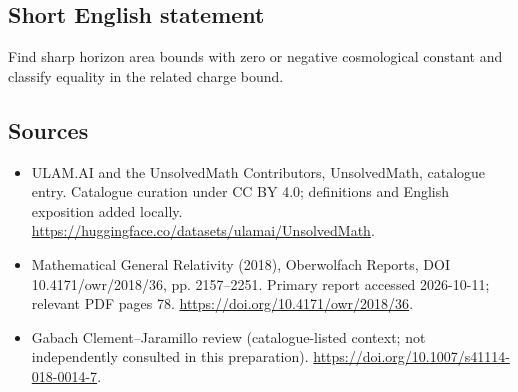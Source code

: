 \documentclass[11pt]{article}
\begin{document}
\subsection{Short English statement}
Find sharp horizon area bounds with zero or negative cosmological constant and classify equality in the related charge bound.
\subsection{Sources}
\begin{itemize}
\item[\hypertarget{source:statement:1}{S1}] ULAM.AI and the UnsolvedMath Contributors, UnsolvedMath, catalogue entry. Catalogue curation under CC BY 4.0; definitions and English exposition added locally.
\url{https://huggingface.co/datasets/ulamai/UnsolvedMath}.
\item[\hypertarget{source:statement:2}{S2}] Mathematical General Relativity (2018), Oberwolfach Reports, DOI 10.4171/owr/2018/36, pp. 2157--2251. Primary report accessed 2026-10-11; relevant PDF pages 78.
\url{https://doi.org/10.4171/owr/2018/36}.
\item[\hypertarget{source:statement:3}{S3}] Gabach Clement--Jaramillo review (catalogue-listed context; not independently consulted in this preparation).
\url{https://doi.org/10.1007/s41114-018-0014-7}.
\end{itemize}
\label{end:statement}
\end{document}
